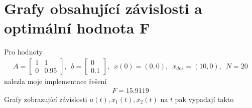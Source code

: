\documentclass[12pt]{article}
\begin{document}
    \section{Grafy obsahující závislosti a optimální hodnota F}\label{sec:grafy-obsahující-závislosti-a-optimální-hodnota-f}
    Pro hodnoty
    \begin{align*}
        A = \begin{bmatrix}
                1 & 1\\
                0 & 0.95
        \end{bmatrix}, \enspace
        b = \begin{bmatrix}
                0 \\
                0.1
        \end{bmatrix}, \enspace
        x(0) = (0,0), \enspace
        x_{des} = (10,0), \enspace
        N = 20
    \end{align*}
    nalezla moje implementace řešení
    \begin{align*}
        F = 15.9119
    \end{align*}
    Grafy zobrazující závislosti $u(t), x_1(t), x_2(t)$ na $t$ pak vypadají takto
\end{document}
